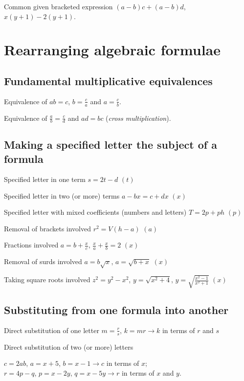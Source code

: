 \documentclass{article}
\begin{document}
Common given bracketed expression \hfill \((a-b)c + (a-b)d\), \(x(y+1) - 2(y+1)\).

\section{Rearranging algebraic formulae}

\subsection{Fundamental multiplicative equivalences}

Equivalence of \(ab=c\), \(b = \frac{c}{a}\) and \(a = \frac{c}{b}\).

Equivalence of \(\frac{a}{b} = \frac{c}{d}\) and \(ad = bc\) (\textit{cross multiplication}).

\subsection{Making a specified letter the subject of a formula}

Specified letter in one term \hfill \(s = 2t - d\)  \((t)\)

Specified letter in two (or more) terms \hfill \(a-bx = c+dx\)  \((x)\)

Specified letter with mixed coefficients (numbers and letters) \hfill \(T= 2p+ph\)  \((p)\)

Removal of brackets involved \hfill \(r^2=V(h-a)\)  \((a)\)

Fractions involved \hfill \(a=b+\frac{x}{c}\), \(\frac{x}{a}+\frac{x}{b} = 2\)  \((x)\)

Removal of surds involved \hfill \(a=b\sqrt{x}\), \(a= \sqrt{b+x}\)  \((x)\)

Taking square roots involved \hfill \(z^2 = y^2 - x^2\), \(y = \sqrt{x^2 + 4}\), \(y = \sqrt{\frac{x^2-1}{x^2+1}}\)  \((x)\)

\subsection{Substituting from one formula into another}

Direct substitution of one letter \hfill \(m = \frac{r}{s}\), \(k = mr \rightarrow k\) in terms of \(r\) and \(s\)

Direct substitution of two (or more) letters
\vspace{-1.2cm}
\begin{flushright}
\(c=2ab\), \(a=x+5\), \(b = x-1 \rightarrow c\) in terms of \(x\); \\
\(r = 4p - q\), \(p = x - 2y\), \(q = x-5y \rightarrow r\) in terms of \(x\) and \(y\).
\end{flushright}
\end{document}
